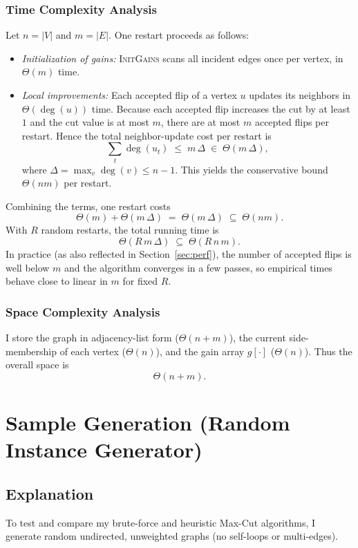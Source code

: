 \documentclass[12pt]{article}
\begin{document}
\subsubsection{Time Complexity Analysis}

Let $n=|V|$ and $m=|E|$. One restart proceeds as follows:
\begin{itemize}
  \item \emph{Initialization of gains:} \textsc{InitGains} scans all incident edges once per vertex, in $\Theta(m)$ time.
  \item \emph{Local improvements:} Each accepted flip of a vertex $u$ updates its neighbors in $\Theta(\deg(u))$ time. Because each accepted flip increases the cut by at least $1$ and the cut value is at most $m$, there are at most $m$ accepted flips per restart. Hence the total neighbor-update cost per restart is 
  \[
    \sum_{t} \deg(u_t) \;\le\; m\,\Delta \;\in\; \Theta(m\,\Delta),
  \]
  where $\Delta=\max_v \deg(v)\le n-1$. This yields the conservative bound $\Theta(nm)$ per restart.
\end{itemize}
Combining the terms, one restart costs
\[
  \Theta(m) + \Theta(m\,\Delta) \;=\; \Theta(m\,\Delta) \;\subseteq\; \Theta(nm).
\]
With $R$ random restarts, the total running time is
\[
  \Theta(R\,m\,\Delta) \;\subseteq\; \Theta(R\,n\,m).
\]
In practice (as also reflected in Section~\ref{sec:perf}), the number of accepted flips is well below $m$ and the algorithm converges in a few passes, so empirical times behave close to linear in $m$ for fixed $R$.

\subsubsection{Space Complexity Analysis}
I store the graph in adjacency-list form ($\Theta(n+m)$), the current side-membership of each vertex ($\Theta(n)$), and the gain array $g[\cdot]$ ($\Theta(n)$). Thus the overall space is
\[
  \Theta(n+m).
\]
\section{Sample Generation (Random Instance Generator)}
\label{sec:sample-gen}

\subsection{Explanation}
To test and compare my brute-force and heuristic Max-Cut algorithms, I generate random undirected, unweighted graphs (no self-loops or multi-edges).
\end{document}
